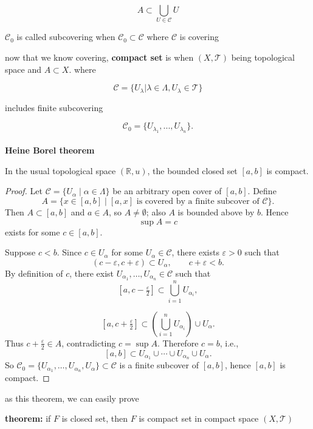 \documentclass{article}
\begin{document}
\[
A\subset \bigcup_{U\in \mathcal{C}}U
\]

$\mathcal{C}_0$ is called subcovering when $\mathcal{C}_0\subset \mathcal{C}$ where $\mathcal{C}$ is covering

now that we know covering, \textbf{compact set} is when $(X,\mathcal{T})$ being topological space and $A\subset X$. where 

\[
\mathcal{C}=\{U_\lambda|\lambda\in \Lambda, U_\lambda\in \mathcal{T}\} 
\]

includes finite subcovering 

\[
\mathcal{C}_0=\{U_{\lambda_1},...,U_{\lambda_n}\}.
\]\\


\textbf{Heine Borel theorem}
\begin{theorem}
In the usual topological space $(\mathbb{R}, u)$, the bounded closed set $[a,b]$ is compact.
\end{theorem}

\begin{proof}
Let $\mathcal{C} = \{U_\alpha \mid \alpha \in \Lambda\}$ be an arbitrary open cover of $[a,b]$. Define
\[
A = \{x \in [a,b] \mid [a,x] \text{ is covered by a finite subcover of } \mathcal{C}\}.
\]
Then $A \subset [a,b]$ and $a \in A$, so $A \neq \emptyset$; also $A$ is bounded above by $b$. Hence
\[
\sup A = c
\]
exists for some $c \in [a,b]$.

Suppose $c < b$. Since $c \in U_\alpha$ for some $U_\alpha \in \mathcal{C}$, there exists $\varepsilon > 0$ such that
\[
(c-\varepsilon, c+\varepsilon) \subset U_\alpha, \qquad c+\varepsilon < b. 
\]
By definition of $c$, there exist $U_{\alpha_1}, \dots, U_{\alpha_n} \in \mathcal{C}$ such that
\[
\left[a, c - \tfrac{\varepsilon}{2}\right] \subset \bigcup_{i=1}^n U_{\alpha_i},
\]

\[
\left[a, c + \tfrac{\varepsilon}{2}\right] \subset \left(\bigcup_{i=1}^n U_{\alpha_i}\right) \cup U_\alpha.
\]
Thus $c + \tfrac{\varepsilon}{2} \in A$, contradicting $c = \sup A$. Therefore $c = b$, i.e.,
\[
[a,b] \subset U_{\alpha_1} \cup \cdots \cup U_{\alpha_n} \cup U_\alpha.
\]
So $\mathcal{C}_0 = \{U_{\alpha_1}, \dots, U_{\alpha_n}, U_\alpha\} \subset \mathcal{C}$ is a finite subcover of $[a,b]$, hence $[a,b]$ is compact.
\end{proof}

as this theorem, we can easily prove

\textbf{theorem:} if $F$ is closed set, then $F$ is compact set in compact space $(X,\mathcal{T})$
\end{document}
